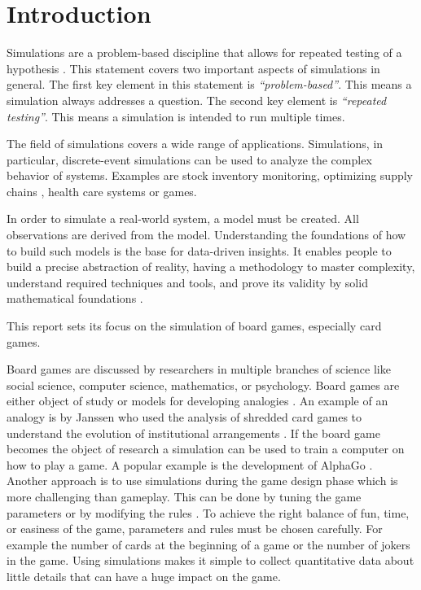 

\section{Introduction}


Simulations are a problem-based discipline that allows for repeated testing of a hypothesis \cite{sokolowski2010modelingintro}. This statement covers two important aspects of simulations in general. The first key element in this statement is \textit{“problem-based”}. This means a simulation always addresses a question. The second key element is \textit{“repeated testing”}. This means a simulation is intended to run multiple times.


The field of simulations covers a wide range of applications.
Simulations, in particular, discrete-event simulations can be used to analyze the complex behavior of systems.
Examples are stock inventory monitoring, optimizing supply chains \cite{krenczyk2014production}, health care systems \cite{jacobson2006discrete, jun1999application} or games.

In order to simulate a real-world system, a model must be created. All observations are derived from the model. Understanding the foundations of how to build such models is the base for data-driven insights. It enables people to build a precise abstraction of reality, having a methodology to master complexity, understand required techniques and tools, and prove its validity by solid mathematical foundations \cite{sokolowski2010modelingintro}.

This report sets its focus on the simulation of board games, especially card games.

Board games are discussed by researchers in multiple branches of science like social science, computer science, mathematics, or psychology. Board games are either object of study or models for developing analogies \cite{gobet2004moves}. An example of an analogy is by Janssen who used the analysis of shredded card games to understand the evolution of institutional arrangements \cite{janssen2010evolution}.
If the board game becomes the object of research a simulation can be used to train a computer on how to play a game. A popular example is the development of AlphaGo \cite{silver2017mastering}. Another approach is to use simulations during the game design phase which is more challenging than gameplay. This can be done by tuning the game parameters or by modifying the rules \cite{hom2007automatic}.
To achieve the right balance of fun, time, or easiness of the game, parameters and rules must be chosen carefully. For example the number of cards at the beginning of a game or the number of jokers in the game. Using simulations makes it simple to collect quantitative data about little details that can have a huge impact on the game.

